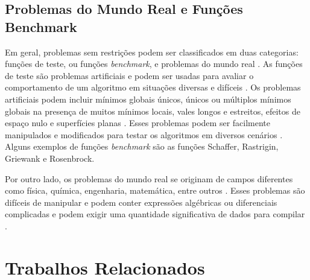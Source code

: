 \section{Problemas do Mundo Real e Funções Benchmark}

Em geral, problemas sem restrições podem ser classificados em duas categorias: funções de teste, ou funções \textit{benchmark}, e problemas do mundo real \cite{jamil}. As funções de teste são problemas artificiais e podem ser usadas para avaliar o comportamento de um algoritmo em situações diversas e difíceis \cite{jamil}. Os problemas artificiais podem incluir mínimos globais únicos, únicos ou múltiplos mínimos globais na presença de muitos mínimos locais, vales longos e estreitos, efeitos de espaço nulo e superfícies planas \cite{jamil}. Esses problemas podem ser facilmente manipulados e modificados para testar os algoritmos em diversos cenários \cite{jamil}. Alguns exemplos de funções \textit{benchmark} são as funções Schaffer, Rastrigin, Griewank e Rosenbrock. 

Por outro lado, os problemas do mundo real se originam de campos diferentes como física, química, engenharia, matemática, entre outros \cite{jamil}. Esses problemas são difíceis de manipular e podem conter expressões algébricas ou diferenciais complicadas e podem exigir uma quantidade significativa de dados para compilar \cite{jamil}. 

\chapter{Trabalhos Relacionados} \label{chap2}




